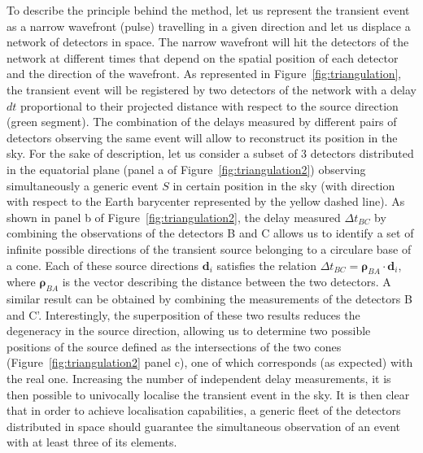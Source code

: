 \documentclass[]{spie}  %
\renewcommand\vec{\bm}
\begin{document}
To describe the principle behind the method, let us represent the transient event as a narrow wavefront (pulse) travelling in a given direction and let us displace a network of detectors in space. The narrow wavefront will hit the detectors of the network at different times that depend on the spatial position of each detector and the direction of the wavefront. As represented in Figure~\ref{fig:triangulation}, the transient event will be registered by two detectors of the network with a delay $dt$ proportional to their projected distance with respect to the source direction (green segment). The combination of the delays measured by different pairs of detectors observing the same event will allow to reconstruct its position in the sky. For the sake of description, let us consider a subset of 3 detectors distributed in the equatorial plane (panel a of Figure~\ref{fig:triangulation2}) observing simultaneously a generic event $S$ in certain position in the sky (with direction with respect to the Earth barycenter represented by the yellow dashed line). As shown in panel b of Figure~\ref{fig:triangulation2}, the delay measured $\Delta t_{BC}$ by combining the observations of the detectors B and C allows us to identify a set of infinite possible directions of the transient source belonging to a circulare base of a cone. Each of these source directions $\vec{d}_i$ satisfies the relation $\Delta t_{BC}=\vec{\rho}_{BA}\cdot \vec{d}_i$, where $\vec{\rho}_{BA}$ is the vector describing the distance between the two detectors. A similar result can be obtained by combining the measurements of the detectors B and C'. Interestingly, the superposition of these two results reduces the degeneracy in the source direction, allowing us to determine two possible positions of the source defined as the intersections of the two cones (Figure~\ref{fig:triangulation2} panel c), one of which corresponds (as expected) with the real one. Increasing the number of independent delay measurements, it is then possible to univocally localise the transient event in the sky. It is then clear that in order to achieve localisation capabilities, a generic fleet of the detectors distributed in space should guarantee the simultaneous observation of an event with at least three of its elements.    
\end{document}
